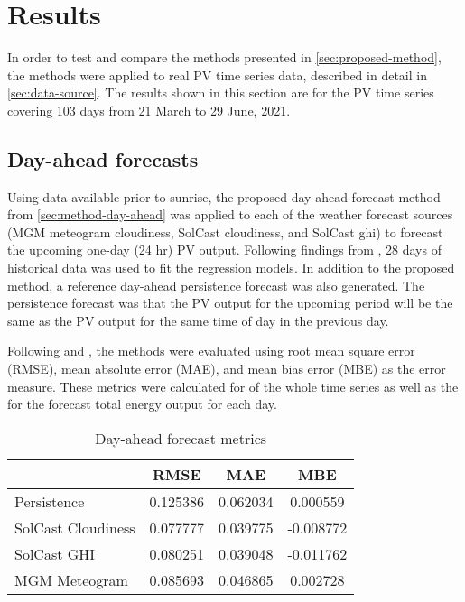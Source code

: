 \section{Results}
\label{sec:results}

In order to test and compare the methods presented in \cref{sec:proposed-method},
the methods were applied to real PV time series data, described in detail in \cref{sec:data-source}.
The results shown in this section are for the PV time series covering
103 days from 21 March to 29 June, 2021.

\subsection{Day-ahead forecasts}

Using data available prior to sunrise, the proposed day-ahead forecast method from  \cref{sec:method-day-ahead} was applied to each of the weather forecast sources
(MGM meteogram cloudiness, SolCast cloudiness, and SolCast ghi)
to forecast the upcoming one-day (24 hr) PV output.
Following findings from \cite{Almeida2015},
28 days of historical data was used to fit the regression models.
In addition to the proposed method, a reference day-ahead persistence forecast was also generated.
The persistence forecast was that the PV output for the upcoming period will be the same as the PV output for the same time of day in the previous day.

Following \cite{Pedro2012} and \cite{Gigoni2018}, the methods were evaluated using root mean square error (RMSE), mean absolute error (MAE), and mean bias error (MBE) as the error measure.
These metrics were calculated for of the whole time series as well as the for the forecast total energy output for each day.

\begin{table}[tbh]
	\centering
	\caption{Day-ahead forecast metrics}
	\label{table:dayahead-metrics}
	\begin{tabular}{lccc}
		\toprule
		                       &   RMSE   &   MAE    &    MBE    \\
        \midrule
		Persistence & 0.125386 & 0.062034 & 0.000559 \\
		SolCast Cloudiness & 0.077777 & 0.039775 & -0.008772 \\
		SolCast GHI & 0.080251 & 0.039048 & -0.011762 \\
		MGM Meteogram & 0.085693 & 0.046865 & 0.002728 \\
		\bottomrule
	\end{tabular}
\end{table}

